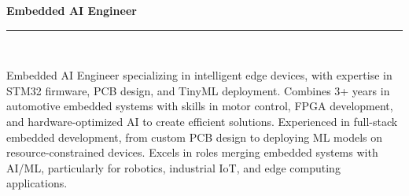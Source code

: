 \begin{center}
    {\Large \textbf{Embedded AI Engineer}} \\
    \rule{\textwidth}{0.4pt} \\%
    \begin{minipage}{\textwidth} %
        \vspace{10pt}
        Embedded AI Engineer specializing in intelligent edge devices, with expertise in STM32 firmware, PCB design, and TinyML deployment. Combines 3+ years in automotive embedded systems with skills in motor control, FPGA development, and hardware-optimized AI to create efficient solutions. Experienced in full-stack embedded development, from custom PCB design to deploying ML models on resource-constrained devices. Excels in roles merging embedded systems with AI/ML, particularly for robotics, industrial IoT, and edge computing applications.
    \end{minipage}
    \vspace{15pt}
\end{center}